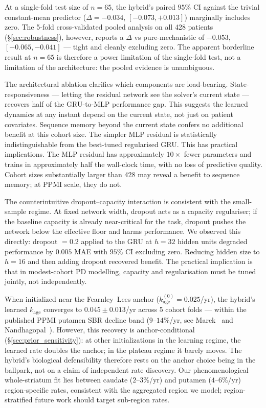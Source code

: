 At a single-fold test size of $n = 65$, the hybrid's paired $95\%$ CI against the trivial constant-mean predictor ($\Delta = -0.034$, $[-0.073, +0.013]$) marginally includes zero. The 5-fold cross-validated pooled analysis on all 428 patients (\S\ref{sec:robustness}), however, reports a $\Delta$ vs pure-mechanistic of $-0.053$, $[-0.065, -0.041]$ --- tight and cleanly excluding zero. The apparent borderline result at $n = 65$ is therefore a power limitation of the single-fold test, not a limitation of the architecture: the pooled evidence is unambiguous.

The architectural ablation clarifies which components are load-bearing. State-responsiveness --- letting the residual network see the solver's current state --- recovers half of the GRU-to-MLP performance gap. This suggests the learned dynamics at any instant depend on the current state, not just on patient covariates. Sequence memory beyond the current state confers no additional benefit at this cohort size. The simpler MLP residual is statistically indistinguishable from the best-tuned regularised GRU. This has practical implications. The MLP residual has approximately $10\times$ fewer parameters and trains in approximately half the wall-clock time, with no loss of predictive quality. Cohort sizes substantially larger than 428 may reveal a benefit to sequence memory; at PPMI scale, they do not.

The counterintuitive dropout--capacity interaction is consistent with the small-sample regime. At fixed network width, dropout acts as a capacity regulariser; if the baseline capacity is already near-critical for the task, dropout pushes the network below the effective floor and harms performance. We observed this directly: dropout $= 0.2$ applied to the GRU at $h = 32$ hidden units degraded performance by $0.005$ MAE with $95\%$ CI excluding zero. Reducing hidden size to $h = 16$ and then adding dropout recovered benefit. The practical implication is that in modest-cohort PD modelling, capacity and regularisation must be tuned jointly, not independently.

When initialized near the Fearnley--Lees anchor ($k_\text{age}^{(0)} = 0.025$/yr), the hybrid's learned $k_\text{age}$ converges to $0.045 \pm 0.013$/yr across 5 cohort folds --- within the published PPMI putamen SBR decline band ($9$--$14\%$/yr, see Marek~\cite{marek2015ppmi} and Nandhagopal~\cite{nandhagopal2009brain}). However, this recovery is anchor-conditional (\S\ref{sec:prior_sensitivity}): at other initializations in the learning regime, the learned rate doubles the anchor; in the plateau regime it barely moves. The hybrid's biological defensibility therefore rests on the anchor choice being in the ballpark, not on a claim of independent rate discovery. Our phenomenological whole-striatum fit lies between caudate ($2$--$3\%$/yr) and putamen ($4$--$6\%$/yr) region-specific rates, consistent with the aggregated region we model; region-stratified future work should target sub-region rates.

